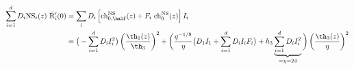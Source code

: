 \begin{equation*}
  \begin{split}
    \sum_{i=1}^d D_i  {\rm NS}_i(z) ~\bar{\rm R}'_i (0) &= \sum_i D_i \left[
    {\rm ch}^{\rm NS}_{0,\half}(z) + F_i ~{\rm ch}^{\rm NS}_0(z) \right] I_i \\
    &= \big(-\sum_{i=1}^d D_i I_i^2 \big) \left({\th_1(z)\over\th_3}
    \right)^2 + \bigg({q^{-1/8}\over\eta} \big(D_1 I_1 + \sum_{i=1}^d
    D_i I_i F_i \big) + h_3  
     \underbrace{\sum_{i=1}^d D_i I_i^2}_{=\chi=24} \bigg)  \left(
   {\th_3(z)\over\eta} \right)^2  
  \end{split}
\end{equation*}

